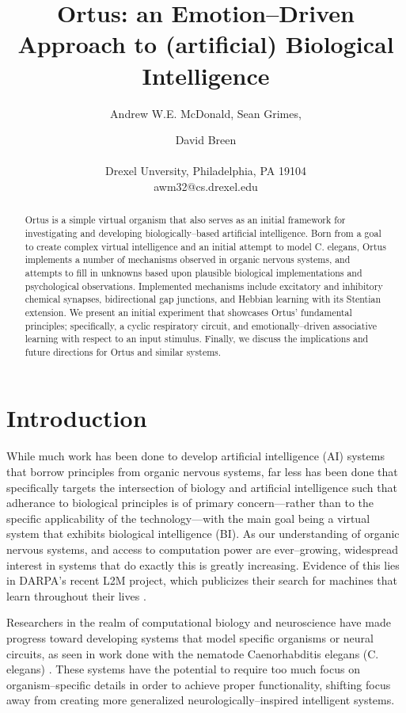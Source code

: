 \documentclass[letterpaper]{article}
\title{Ortus: an Emotion--Driven Approach to (artificial) Biological Intelligence}
\author{Andrew W.E. McDonald, Sean Grimes,\and David Breen \\
\mbox{}\\
Drexel Unversity, Philadelphia, PA 19104 \\
awm32@cs.drexel.edu} %
\begin{document}
\maketitle

\begin{abstract}
 Ortus is a simple virtual organism that also serves as an initial framework for investigating and developing biologically--based artificial intelligence. Born from a goal to create complex virtual intelligence and an initial attempt to model C. elegans, Ortus implements a number of mechanisms observed in organic nervous systems, and attempts to fill in unknowns based upon plausible biological implementations and psychological observations. Implemented mechanisms include excitatory and inhibitory chemical synapses, bidirectional gap junctions, and Hebbian learning with its Stentian extension.  We present an initial experiment that showcases Ortus' fundamental principles; specifically, a cyclic respiratory circuit, and emotionally--driven associative learning with respect to an input stimulus. Finally, we discuss the implications and future directions for Ortus and similar systems.


\end{abstract}

\section{Introduction}


While much work has been done to develop artificial intelligence (AI) systems that borrow principles from organic nervous systems, far less has been done that specifically targets the intersection of biology and artificial intelligence such that adherance to biological principles is of primary concern---rather than to the specific applicability of the technology---with the main goal being a virtual system that exhibits biological intelligence (BI).
As our understanding of organic nervous systems, and access to computation power are ever--growing, widespread interest in systems that do exactly this is greatly increasing. Evidence of this lies in DARPA's recent L2M project, which publicizes their search for machines that learn throughout their lives \citep{darpa}.

Researchers in the realm of computational biology and neuroscience have made progress toward developing systems that model specific organisms or neural circuits, as seen in work done with the nematode Caenorhabditis elegans (C. elegans) \citep{Izquierdo2016}. These systems have the potential to require too much focus on organism--specific details in order to achieve proper functionality, shifting focus away from creating more generalized neurologically--inspired intelligent systems.
\end{document}

